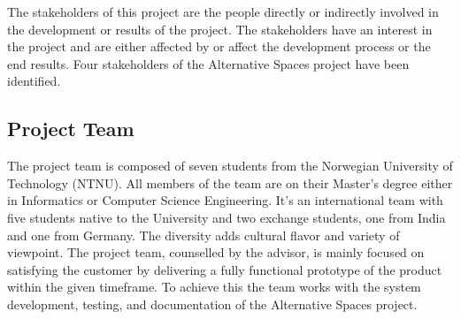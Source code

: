 The stakeholders of this project are the people directly or indirectly involved in the development or results of the project. The stakeholders have an interest in the project and are either affected by or affect the development process or the end results. Four stakeholders of the Alternative Spaces project have been identified.

\subsection{Project Team}
\label{subsec:IntroStakeProjectTeam}

The project team is composed of seven students from the Norwegian University of Technology (NTNU). All members of the team are on their Master's degree either in Informatics or Computer Science Engineering. It's an international team with five students native to the University and two exchange students, one from India and one from Germany. The diversity adds cultural flavor and variety of viewpoint. The project team, counselled by the advisor, is mainly focused on satisfying the customer by delivering a fully functional prototype of the product within the given timeframe. To achieve this the team works with the system development, testing, and documentation of the Alternative Spaces project.

